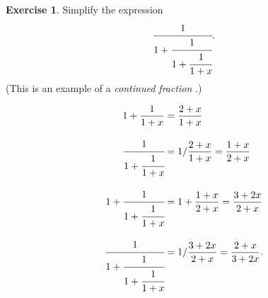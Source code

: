 \documentclass[a4paper]{book}
\newcommand{\PURPLE}[1]{{\color{purple}#1}}
\renewcommand{\:}{\colon}
\newcommand{\mathworld}[1]{}
\newcommand{\DEFN}[1]{\PURPLE{\emph{#1}}}
\theoremstyle{definition}
\newtheorem{exercise}[theorem]{Exercise}
\renewenvironment{solution}{\SolutionInline}{\endSolutionInline}
\begin{document}
\begin{exercise}
 Simplify the expression
 \[ \cfrac{1}{1+ \cfrac{1}{1+ \cfrac{1}{1+x}}}. \]
 (This is an example of a \DEFN{continued fraction}
 \mathworld{ContinuedFraction}.)
\end{exercise}
\begin{solution}
 \begin{align*}
  1+\frac{1}{1+x} &= \frac{2+x}{1+x} \\[2ex]
  \cfrac{1}{1+\cfrac{1}{1+x}} &= 
   1/\frac{2+x}{1+x} = \frac{1+x}{2+x} \\[2ex]
  1+\cfrac{1}{1+\cfrac{1}{1+x}} &= 
   1+\frac{1+x}{2+x} = \frac{3+2x}{2+x} \\[2ex]
  \cfrac{1}{1+\cfrac{1}{1+\cfrac{1}{1+x}}} &= 
   1/\frac{3+2x}{2+x} = \frac{2+x}{3+2x}.
 \end{align*}
\end{solution}
\end{document}
